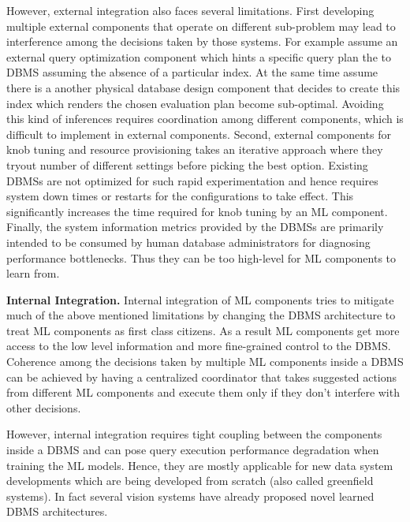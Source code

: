 However, external integration also faces several limitations.
First developing multiple external components that operate on different sub-problem may lead to interference among the decisions taken by those systems.
For example assume an external query optimization component which hints a specific query plan the to DBMS assuming the absence of a particular index.
At the same time assume there is a another physical database design component that decides to create this index which renders the chosen evaluation plan become sub-optimal.
Avoiding this kind of inferences requires coordination among different components, which is difficult to implement in external components.
Second, external components for knob tuning and resource provisioning takes an iterative approach where they tryout number of different settings before picking the best option.
Existing DBMSs are not optimized for such rapid experimentation and hence requires system down times or restarts for the configurations to take effect.
This significantly increases the time required for knob tuning by an ML component.
Finally, the system information metrics provided by the DBMSs are primarily intended to be consumed by human database administrators for diagnosing performance bottlenecks.
Thus they can be too high-level for ML components to learn from.


\vspace{2mm}
\noindent \textbf{Internal Integration.} 
Internal integration of ML components tries to mitigate much of the above mentioned limitations by changing the DBMS architecture to treat ML components as first class citizens.
As a result ML components get more access to the low level information and more fine-grained control to the DBMS.
Coherence among the decisions taken by multiple ML components inside a DBMS can be achieved by having a centralized coordinator that takes suggested actions from different ML components and execute them only if they don't interfere with other decisions.

However, internal integration requires tight coupling between the components inside a DBMS and can pose query execution performance degradation when training the ML models.
Hence, they are mostly applicable for new data system developments which are being developed from scratch (also called greenfield systems).
In fact several vision systems have already proposed novel learned DBMS architectures.

